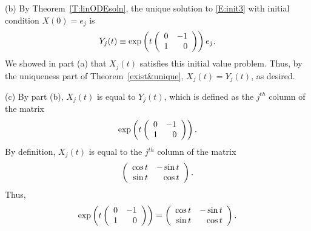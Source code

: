\documentclass{ximera}
\begin{document}
\begin{exercise}
\begin{solution}
(b) By Theorem~\ref{T:linODEsoln}, the unique
solution to \eqref{E:init3} with initial condition $X(0) = e_j$ is
\[
Y_j(t) \equiv \exp\left(t\left(\begin{array}{rr} 0 & -1\\ 1 &0\end{array}\right)\right)e_j.
\]
We showed in part (a) that $X_j(t)$ satisfies this initial value
problem.  Thus, by the uniqueness part of Theorem~\ref{exist&unique},
$X_j(t) = Y_j(t)$, as desired.

(c) By part (b), $X_j(t)$ is equal to $Y_j(t)$, which is defined as
the $j^{th}$ column of the matrix
\[
\exp\left(t\left(\begin{array}{rr} 0 & -1\\ 1 &0\end{array}\right)\right).
\]
By definition, $X_j(t)$ is equal to the $j^{th}$ column of the matrix
\[
\left(\begin{array}{rr} \cos t & -\sin t\\ \sin t &\cos t\end{array}\right).
\]
Thus,
\[
\exp\left(t\left(\begin{array}{rr} 0 & -1\\ 1 &0\end{array}\right)\right) =
\left(\begin{array}{rr} \cos t & -\sin t\\ \sin t &\cos t\end{array}\right).
\]

\end{solution}
\end{exercise}
\end{document}
